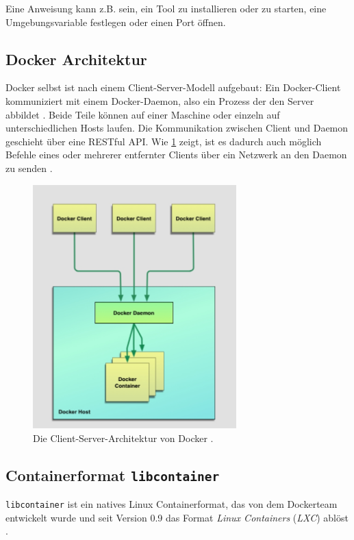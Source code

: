 \documentclass[../main.tex]{subfiles}
\begin{document}
      Eine Anweisung kann z.B. sein, ein Tool zu installieren oder zu starten, eine Umgebungsvariable festlegen oder einen Port öffnen.



    \subsection{Docker Architektur}
      Docker selbst ist nach einem Client-Server-Modell aufgebaut: Ein Docker-Client kommuniziert mit einem Docker-Daemon, also ein Prozess der den Server abbildet \cite{dockerUnderstandingDocker}. Beide Teile können auf einer Maschine oder einzeln auf unterschiedlichen Hosts laufen. Die Kommunikation zwischen Client und Daemon geschieht über eine RESTful API. Wie \fig \ref{fig:intro_dockerArchitecture} zeigt, ist es dadurch auch möglich Befehle eines oder mehrerer entfernter Clients über ein Netzwerk an den Daemon zu senden \cite{dockerSec1}.

      \begin{figure}[h]
          \centering
          \includegraphics[width=0.7\textwidth]{./images/intro_dockerArchitecture1.jpg}
          \caption{Die Client-Server-Architektur von Docker \cite[S.10]{dockerBook}.}
          \label{fig:intro_dockerArchitecture}
      \end{figure}


    \subsection{Containerformat \texttt{libcontainer}}
      \texttt{libcontainer} ist ein natives Linux Containerformat, das von dem Dockerteam entwickelt wurde und seit Version 0.9 das Format \emph{Linux Containers} (\emph{LXC}) ablöst \cite{dockerSec1}.

\end{document}
